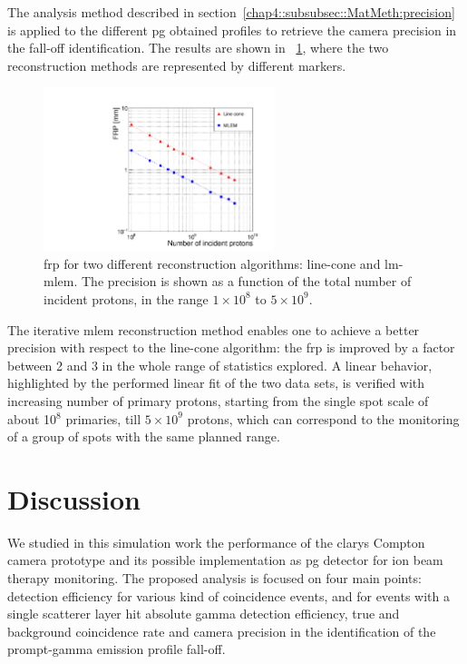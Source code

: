 The analysis method described in section~\ref{chap4::subsubsec::MatMeth:precision} is applied to the different \gls{pg} obtained profiles to retrieve the camera precision in the fall-off identification. The results are shown in \figurename~\ref{chap4::fig::precision}, where the two reconstruction methods are represented by different markers.

\begin{figure}	
\centering
\includegraphics[width=0.6\textwidth]{03_GraphicFiles/chapter4_HTsimu/new/precisionVSprimaries.pdf}
\caption{\gls{frp} for two different reconstruction algorithms: line-cone and \gls{lm-mlem}. The precision is shown as a function of the total number of incident protons, in the range $1\times10^{8}$ to $5\times10^{9}$.}	
\label{chap4::fig::precision}
\end{figure}

The iterative \gls{mlem} reconstruction method enables one to achieve a better precision with respect to the line-cone algorithm: the \gls{frp} is improved by a factor between 2 and 3 in the whole range of statistics explored. A linear behavior, highlighted by the performed linear fit of the two data sets, is verified with increasing number of primary protons, starting from the single spot scale of about 10$^8$ primaries, till $5\times10^9$ protons, which can correspond to the monitoring of a group of spots with the same planned range. 

\section{Discussion}

We studied in this simulation work the performance of the \gls{clarys} Compton camera prototype and its possible implementation as \gls{pg} detector for ion beam therapy monitoring. The proposed analysis is focused on four main points: detection efficiency for various kind of coincidence events, and for events with a single scatterer layer hit absolute gamma detection efficiency, true and background coincidence rate and camera precision in the identification of the prompt-gamma emission profile fall-off.

